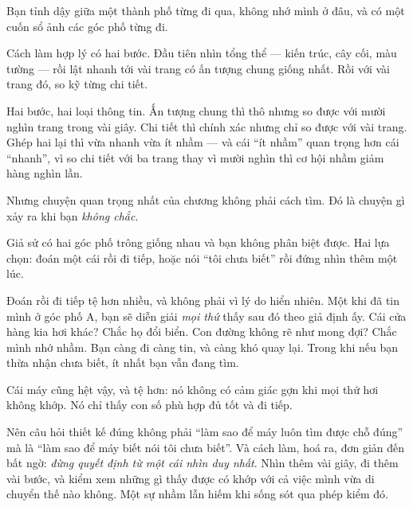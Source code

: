 \documentclass[../../vslam.tex]{subfiles}
\begin{document}
\begin{dongian}
Bạn tỉnh dậy giữa một thành phố từng đi qua, không nhớ mình ở đâu, và có một cuốn sổ ảnh các góc phố từng đi.

Cách làm hợp lý có hai bước. Đầu tiên nhìn tổng thể --- kiến trúc, cây cối, màu tường --- rồi lật nhanh tới vài trang có ấn tượng chung giống nhất. Rồi với vài trang đó, so kỹ từng chi tiết.

Hai bước, hai loại thông tin. Ấn tượng chung thì thô nhưng so được với mười nghìn trang trong vài giây. Chi tiết thì chính xác nhưng chỉ so được với vài trang. Ghép hai lại thì vừa nhanh vừa ít nhầm --- và cái ``ít nhầm'' quan trọng hơn cái ``nhanh'', vì so chi tiết với ba trang thay vì mười nghìn thì cơ hội nhầm giảm hàng nghìn lần.

Nhưng chuyện quan trọng nhất của chương không phải cách tìm. Đó là chuyện gì xảy ra khi bạn \emph{không chắc}.

Giả sử có hai góc phố trông giống nhau và bạn không phân biệt được. Hai lựa chọn: đoán một cái rồi đi tiếp, hoặc nói ``tôi chưa biết'' rồi đứng nhìn thêm một lúc.

Đoán rồi đi tiếp tệ hơn nhiều, và không phải vì lý do hiển nhiên. Một khi đã tin mình ở góc phố A, bạn sẽ diễn giải \emph{mọi thứ} thấy sau đó theo giả định ấy. Cái cửa hàng kia hơi khác? Chắc họ đổi biển. Con đường không rẽ như mong đợi? Chắc mình nhớ nhầm. Bạn càng đi càng tin, và càng khó quay lại. Trong khi nếu bạn thừa nhận chưa biết, ít nhất bạn vẫn đang tìm.

Cái máy cũng hệt vậy, và tệ hơn: nó không có cảm giác gợn khi mọi thứ hơi không khớp. Nó chỉ thấy con số phù hợp đủ tốt và đi tiếp.

Nên câu hỏi thiết kế đúng không phải ``làm sao để máy luôn tìm được chỗ đúng'' mà là ``làm sao để máy biết nói tôi chưa biết''. Và cách làm, hoá ra, đơn giản đến bất ngờ: \emph{đừng quyết định từ một cái nhìn duy nhất}. Nhìn thêm vài giây, đi thêm vài bước, và kiểm xem những gì thấy được có khớp với cả việc mình vừa di chuyển thế nào không. Một sự nhầm lẫn hiếm khi sống sót qua phép kiểm đó.

\end{dongian}
\end{document}
